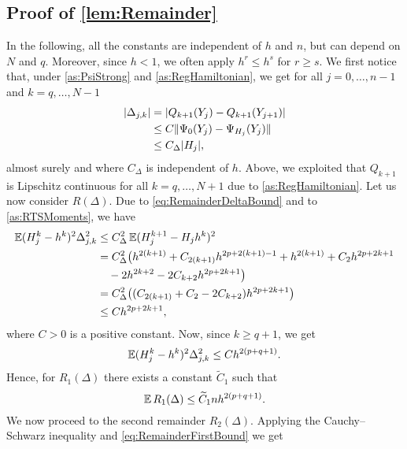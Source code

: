 \documentclass[10pt]{article}
\begin{document}
\subsection*{Proof of \cref{lem:Remainder}}
In the following, all the constants are independent of $h$ and $n$, but can depend on $N$ and $q$. Moreover, since $h < 1$, we often apply $h^r \leq h^s$ for $r \geq s$. We first notice that, under \cref{as:PsiStrong} and \cref{as:RegHamiltonian}, we get for all $j = 0, \ldots, n-1$ and $k = q, \ldots, N-1$
	\begin{equation}\label{eq:RemainderDeltaBound}
	\begin{aligned}
		\lvert\Delta_{j,k}\rvert &= \lvert Q_{k+1}(Y_j) - Q_{k+1}(Y_{j+1})\rvert\\
		&\leq C {\lVert\Psi_0(Y_j) - \Psi_{H_j}(Y_j)\rVert}\\
		&\leq C_\Delta \lvert H_j\rvert,
	\end{aligned}
	\end{equation}
	almost surely and where $C_\Delta$ is independent of $h$. {Above, we exploited that $Q_{k+1}$ is Lipschitz continuous for all $k=q, \ldots, N+1$ due to \cref{as:RegHamiltonian}.} Let us now consider $R(\Delta)$. {Due to \eqref{eq:RemainderDeltaBound} and to \cref{as:RTSMoments}}, we have
	\begin{equation}\label{eq:RemainderFirstBound}
	\begin{aligned}
		\operatorname{\mathbb{E}} (H_j^k - h^k)^2 \Delta_{j,k}^2 &\leq {C_\Delta^2}\operatorname{\mathbb{E}}(H_j^{k+1} - H_j h^k)^2\\
		&= {C_\Delta^2}\big(h^{2(k+1)} + C_{2(k+1)}h^{2p+2(k+1)-1} + h^{2(k+1)} + C_2 h^{2p+2k+1}  \\
		&\quad - 2h^{2k+2} - 2C_{k+2}h^{2p+2k+1}\big)\\
		&= {C_\Delta^2}\big((C_{2(k+1)} + C_2 - 2C_{k+2})h^{2p+2k+1}\big)\\
		&\leq C h^{2p+2k+1},
	\end{aligned}
	\end{equation}
	where $C > 0$ is a positive constant. Now, since $k \geq q+1$, we get
	\begin{equation}\label{eq:RemainderSecondBound}
		\operatorname{\mathbb{E}} (H_j^k - h^k)^2 \Delta_{j,k}^2 \leq C h^{2(p+q+1)}.
	\end{equation}
	Hence, for $R_1(\Delta)$ there exists a constant $\tilde C_1$ such that
	\begin{equation}
		\operatorname{\mathbb{E}} R_1(\Delta) \leq \widetilde C_1 n h^{2(p+q+1)}.
	\end{equation}
	We now proceed to the second remainder $R_2(\Delta)$. Applying the Cauchy--Schwarz inequality and \eqref{eq:RemainderFirstBound} we get
\end{document}

